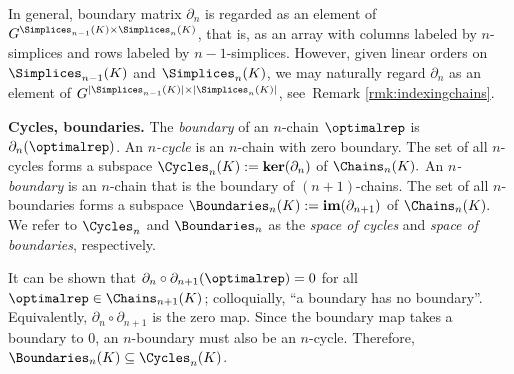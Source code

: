 

\begin{remark}
\label{rmk:boundarymatrixindexing}
In general, boundary matrix $\partial_n$ is regarded as an element of $G^{\Simplices_{n-1}(K) \times \Simplices_{n}(K)}$, that is, as an array with columns labeled by $n$-simplices and rows labeled by $n-1$-simplices.  However, given linear orders on  $\Simplices_{n-1}(K)$ and $\Simplices_{n}(K)$, we may naturally regard $\partial_n$ as an element of $G^{|\Simplices_{n-1}(K)| \times |\Simplices_{n}(K)|}$, see\ Remark \ref{rmk:indexingchains}. 
\end{remark} 


\noindent \textbf{Cycles, boundaries.}  The \emph{boundary} of an $n$-chain $\optimalrep$ is  $\partial_n (\optimalrep)$.
An \textit{$n$-cycle} is an $n$-chain with zero boundary. The set of all $n$-cycles forms a subspace $\Cycles_n(K) := \textbf{ker}(\partial_n)$ of $\Chains_n(K).$ An \textit{$n$-boundary} is an $n$-chain that is the boundary of $(n+1)$-chains. The set of all $n$-boundaries forms a subspace $\Boundaries_n(K):= \textbf{im}(\partial_{n+1})$ of $\Chains_n(K).$   We refer to $\Cycles_n$ and $\Boundaries_n$ as the \emph{space of cycles} and \emph{space of boundaries}, respectively.

It can be shown that $\partial_n \circ \partial_{n+1}(\optimalrep) = 0$ for all $\optimalrep \in \Chains_{n+1}(K)$; colloquially,  ``a boundary has no boundary''. Equivalently,  $\partial_n \circ \partial_{n+1}$ is the zero map.
Since the boundary map takes a boundary to $0$, an $n$-boundary must also be an $n$-cycle. Therefore, $\Boundaries_n(K) \subseteq \Cycles_n(K)$. 




